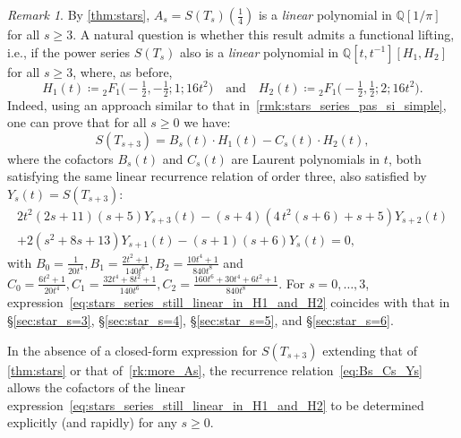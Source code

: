 \documentclass[12pt]{amsart}
\newcommand{\revision}[1]{{#1}}
\theoremstyle{plain}
\theoremstyle{remark}
\newtheorem{remark}[lemma]{Remark}
\def\Q{\mathbb{Q}}
\def\Q{\mathbb{Q}}
\begin{document}
\begin{remark}\label{rmk:stars_series_still_linear_in_H1_and_H2}
\revision{
By \cref{thm:stars}, $A_s=S(T_s)(\tfrac14)$ is a \emph{linear} polynomial in $\Q[1/\pi]$ for all $s \geq 3$.
A natural question is whether this result admits a functional lifting, i.e., if the power series $S(T_s)$ also is a \emph{linear} polynomial in $\Q[t,t^{-1}][H_1, H_2]$ for all $s \geq 3$,
where, as before,
\[
H_1(t) \coloneqq {}_{2}^{}{{}{{}{F_{1}^{}}}}\big(-\tfrac12,-\tfrac12; 1;16t^2\big)
\quad \text{and} \quad
H_2(t) \coloneqq {}_{2}^{}{{}{{}{F_{1}^{}}}}\big(-\tfrac12,\tfrac12; 2;16t^2\big).
\]
Indeed, using an approach similar to that in~\cref{rmk:stars_series_pas_si_simple}, one 
can prove that for all $s \geq 0$ we have:
\begin{equation}\label{eq:stars_series_still_linear_in_H1_and_H2}
S(T_{s+3}) =
B_s(t) \cdot H_1(t)
-
C_s(t) \cdot H_2(t) ,
\end{equation}
 where the cofactors $B_s(t)$ and $C_s(t)$ are Laurent polynomials in $t$, both satisfying the same linear recurrence relation of order three, also satisfied by $Y_s(t) = S(T_{s+3})$:
\begin{equation} \label{eq:Bs_Cs_Ys}
\begin{split}
2 t^{2} \left(2 s +11\right) \left(s +5\right) Y_{s+3}(t)
-\left(s +4\right) \left(4 \,t^{2} ( s+6) + s +5\right) Y_{s+2}(t) \\
+ 2 \left(s^{2}+8 s +13\right) Y_{s+1}(t) 
-\left(s +1\right) \left(s +6\right) Y_s(t)
= 0,
\end{split}
\end{equation}
with %
 \(
B_0 = \frac{1}{20 t^{4}}, 
B_1 = \frac{2 t^{2}+1}{140 t^{6}}, 
B_2 = \frac{10 t^{4}+1}{840 t^{8}}
\) and
\(
C_0 = \frac{6 t^{2}+1}{20 t^{4}}, 
C_1 = \frac{32 t^{4}+8 t^{2}+1}{140 t^{6}}, 
C_2 = \frac{160 t^{6}+30 t^{4}+6 t^{2}+1}{840 t^{8}}
\).
%
For $s=0, \ldots, 3$, 
expression~\eqref{eq:stars_series_still_linear_in_H1_and_H2} coincides with that in
\S\ref{sec:star_s=3}, 
\S\ref{sec:star_s=4}, 
\S\ref{sec:star_s=5}, 
and
\S\ref{sec:star_s=6}.
}

\revision
{In the absence of a closed-form expression for $S(T_{s+3})$ extending that of \cref{thm:stars} or that of~\cref{rk:more_As}, the recurrence relation~\eqref{eq:Bs_Cs_Ys} allows the cofactors of the linear expression~\eqref{eq:stars_series_still_linear_in_H1_and_H2} to be determined explicitly (and rapidly) for any $s \geq 0$.
}


\end{remark}
\end{document}
